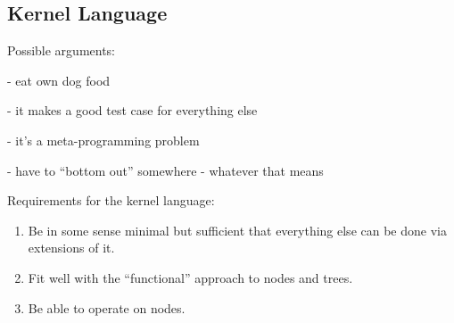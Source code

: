 


\subsection{Kernel Language}



Possible arguments:

- eat own dog food

- it makes a good test case for everything else

- it's a meta-programming problem

- have to ``bottom out'' somewhere - whatever that means

Requirements for the kernel language:
\begin{enumerate}
\item Be in some sense minimal but sufficient that everything else can be done via extensions of it.
\item Fit well with the ``functional'' approach to nodes and trees.
\item Be able to operate on nodes.
\end{enumerate}

